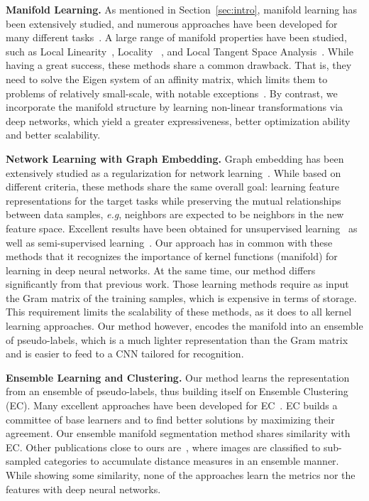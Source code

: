 \documentclass{bmvc2k}
\def\eg{\emph{e.g}\bmvaOneDot}
\begin{document}
\noindent
\textbf{Manifold Learning.} 
As mentioned in Section~\ref{sec:intro}, manifold learning has been
extensively studied, and numerous approaches have been developed for many different  tasks~\cite{lle:science:00,manifold:clustering,manifold:visualizing,Belkin:semiframe:2006,dai:metric:imitation}. 
A large range of manifold properties have been
studied, such as Local Linearity~\cite{lle:science00, NPEmbedding:iccv05}, Locality ~\cite{eigenmaps:nips01}, and Local Tangent Space Analysis~\cite{ltsa}. While having a great success, these methods share a common drawback. That is, they need
to solve the Eigen system of an affinity matrix, which limits them to
problems of relatively small-scale, with notable exceptions~\cite{large:manifold}. 
By contrast, we incorporate the manifold structure by learning non-linear transformations via deep networks, which yield a greater expressiveness, better optimization ability and better scalability.

\noindent
\textbf{Network Learning with Graph Embedding.} 
Graph embedding has been extensively studied as a regularization for network learning~\cite{Weston:2008,deep:kernel:reg:09, manifold:cnn:14, revisiting:semi_graph}. While based on different criteria, these methods share the same overall goal: learning feature representations for the target tasks while preserving the mutual relationships between data samples, \eg, neighbors are expected to be neighbors in the new feature space. Excellent results have been obtained for unsupervised learning~\cite{hadsell2006dimensionality} as well as semi-supervised learning~\cite{Weston:2008,revisiting:semi_graph}.
Our approach has in common with these methods that it recognizes the
importance of kernel functions (manifold) for learning in deep neural
networks. At the same time, our method differs significantly from that
previous work. Those learning methods require as input the Gram matrix 
of the training samples, which is expensive in terms of storage. This 
requirement limits the scalability of these methods, as it does to all 
kernel learning approaches. Our method however, encodes the manifold 
into an ensemble of pseudo-labels, which is a much lighter representation
than the Gram matrix and is easier to feed to a CNN tailored for recognition.


\noindent
\textbf{Ensemble Learning and Clustering.} 
Our method learns the representation from an ensemble of pseudo-labels, 
thus building itself on Ensemble Clustering (EC). Many excellent approaches have been developed for EC~\cite{strehl2002cluster, dai:ensemble:eccv12, spectral:ensemble:clustering}. EC builds a committee of base
learners and to find better solutions by maximizing their agreement. Our ensemble manifold segmentation method shares similarity with EC. Other publications close to ours
are~\cite{strehl2002cluster,ensemble:iccv11,dai:ensemble:eccv12},
where images are classified to sub-sampled categories to accumulate
distance measures in an ensemble manner. While showing some similarity,
none of the approaches learn the metrics nor the features with deep neural
networks.
\end{document}
